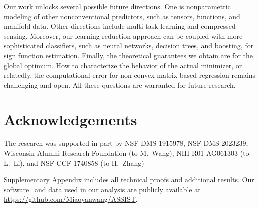 \documentclass[aos]{imsart}
\theoremstyle{definition}
\def\NonparaM{\text{\bf \footnotesize ASSIST}}
\begin{document}
Our work unlocks several possible future directions. One is nonparametric modeling of other nonconventional predictors, such as tensors, functions, and manifold data. Other directions include multi-task learning and compressed sensing. Moreover, our learning reduction approach can be coupled with more sophisticated classifiers, such as neural networks, decision trees, and boosting, for sign function estimation. Finally, the theoretical guarantees we obtain are for the global optimum. How to characterize the behavior of the actual minimizer, or relatedly, the computational error for non-convex matrix based regression remains challenging and open. All these questions are warranted for future research. 





\section*{Acknowledgements}
The research was supported in part by NSF DMS-1915978, NSF DMS-2023239, Wisconsin Alumni Research Foundation (to M.\ Wang), NIH R01 AG061303 (to L.\ Li), and NSF CCF-1740858 (to H.\ Zhang)





\begin{supplement}
Supplementary Appendix includes all technical proofs and additional results. Our software \NonparaM\ and data used in our analysis are publicly available at \url{https://github.com/Miaoyanwang/ASSIST}.
\end{supplement}





 
       
\end{document}

